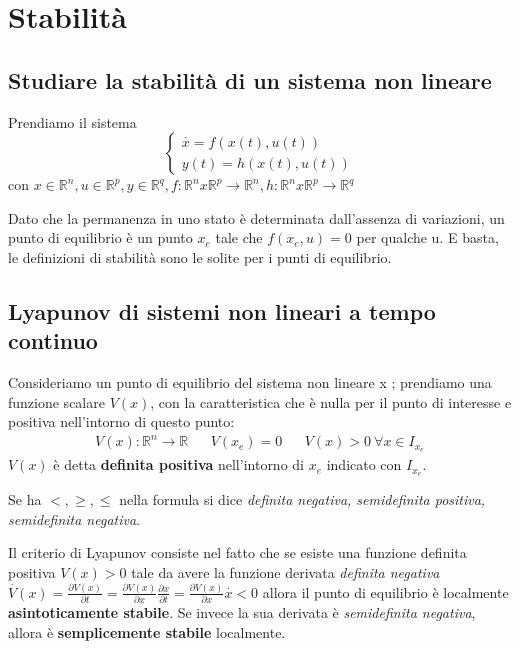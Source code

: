 \documentclass{article}
\begin{document}
\section{Stabilità}

\subsection{Studiare la stabilità di un sistema non lineare}
Prendiamo il sistema 
\[
\begin{cases}
    \overset{\cdot}{x} = f(x(t),u(t))\\
    y(t) = h(x(t),u(t))
\end{cases}    
\]
con $x\in\mathbb{R}^n,u\in\mathbb{R}^p,y\in\mathbb{R}^q,f:\mathbb{R}^nx\mathbb{R}^p\to\mathbb{R}^n,h:\mathbb{R}^nx\mathbb{R}^p\to\mathbb{R}^q$

Dato che la permanenza in uno stato è determinata dall'assenza di variazioni, un punto di equilibrio
è un punto $x_e$ tale che $f(x_e,u) = 0$ per qualche u.
E basta, le definizioni di stabilità sono le solite per i punti di equilibrio.

\subsection{Lyapunov di sistemi non lineari a tempo continuo}
Consideriamo un punto di equilibrio del sistema
non lineare x ; prendiamo una funzione scalare $V (x)$, con la caratteristica che è nulla per il punto di interesse
e positiva nell'intorno di questo punto:
\begin{align*}
    V(x) : \mathbb{R}^n\to\mathbb{R} & & 
    V(x_e) = 0 & & V(x) >0\ \forall x \in I_{x_e}
\end{align*}
$V(x)$ è detta \textbf{definita positiva} nell'intorno di $x_e$ indicato con $I_{x_e}$.

Se ha $<, \ge, \le$ nella formula si dice 
\textit{definita negativa, semidefinita positiva, semidefinita negativa}.

Il criterio di Lyapunov consiste nel fatto che se esiste una funzione definita positiva $V (x) > 0$ tale da avere la
funzione derivata \textit{definita negativa}
$\overset{\cdot}{V}(x) = \frac{\partial V(x)}{\partial t} =\frac{\partial V(x)}{\partial x}\frac{\partial x}{\partial t}
=\frac{\partial V(x)}{\partial x} \overset{\cdot}{x} <0$
allora il punto di equilibrio è localmente \textbf{asintoticamente stabile}.
Se invece  la sua derivata è \textit{semidefinita negativa}, allora è
\textbf{semplicemente stabile} localmente.
\end{document}

